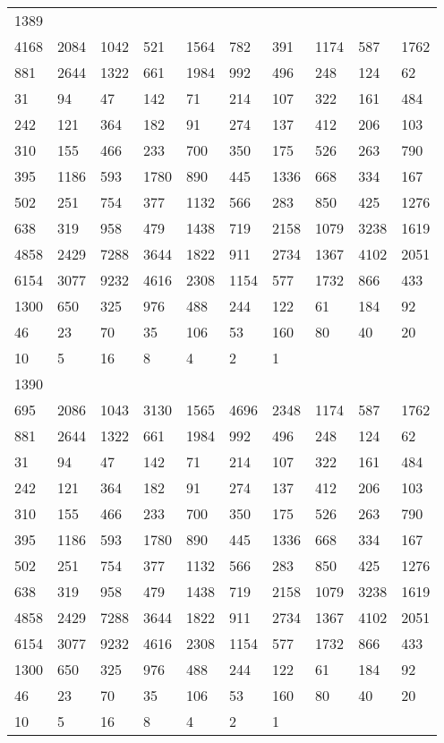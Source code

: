 \begin{longtable}{*{10}{l}}
1389&&&&&&&&&\\
4168& 2084& 1042& 521& 1564& 782& 391& 1174& 587& 1762\\
881& 2644& 1322& 661& 1984& 992& 496& 248& 124& 62\\
31& 94& 47& 142& 71& 214& 107& 322& 161& 484\\
242& 121& 364& 182& 91& 274& 137& 412& 206& 103\\
310& 155& 466& 233& 700& 350& 175& 526& 263& 790\\
395& 1186& 593& 1780& 890& 445& 1336& 668& 334& 167\\
502& 251& 754& 377& 1132& 566& 283& 850& 425& 1276\\
638& 319& 958& 479& 1438& 719& 2158& 1079& 3238& 1619\\
4858& 2429& 7288& 3644& 1822& 911& 2734& 1367& 4102& 2051\\
6154& 3077& 9232& 4616& 2308& 1154& 577& 1732& 866& 433\\
1300& 650& 325& 976& 488& 244& 122& 61& 184& 92\\
46& 23& 70& 35& 106& 53& 160& 80& 40& 20\\
10& 5& 16& 8& 4& 2& 1& \\

1390&&&&&&&&&\\
695& 2086& 1043& 3130& 1565& 4696& 2348& 1174& 587& 1762\\
881& 2644& 1322& 661& 1984& 992& 496& 248& 124& 62\\
31& 94& 47& 142& 71& 214& 107& 322& 161& 484\\
242& 121& 364& 182& 91& 274& 137& 412& 206& 103\\
310& 155& 466& 233& 700& 350& 175& 526& 263& 790\\
395& 1186& 593& 1780& 890& 445& 1336& 668& 334& 167\\
502& 251& 754& 377& 1132& 566& 283& 850& 425& 1276\\
638& 319& 958& 479& 1438& 719& 2158& 1079& 3238& 1619\\
4858& 2429& 7288& 3644& 1822& 911& 2734& 1367& 4102& 2051\\
6154& 3077& 9232& 4616& 2308& 1154& 577& 1732& 866& 433\\
1300& 650& 325& 976& 488& 244& 122& 61& 184& 92\\
46& 23& 70& 35& 106& 53& 160& 80& 40& 20\\
10& 5& 16& 8& 4& 2& 1& \\


\end{longtable}
